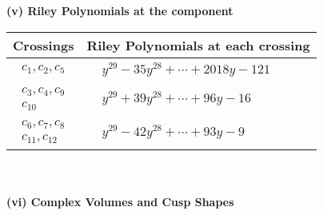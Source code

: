 \documentclass[1p]{elsarticle_modified}
\theoremstyle{definition}
\begin{document}
\newpage\renewcommand{\arraystretch}{1}
\flushleft \textbf{(v) Riley Polynomials at the component}\newline \\
\begin{tabular}{m{50pt}|m{274pt}}
Crossings & \hspace{64pt}Riley Polynomials at each crossing \\
\hline $$\begin{aligned}c_{1},c_{2},c_{5}\end{aligned}$$&$\begin{aligned}
&y^{29}-35 y^{28}+\cdots+2018 y-121
\end{aligned}$\\
\hline $$\begin{aligned}c_{3},c_{4},c_{9}\\c_{10}\end{aligned}$$&$\begin{aligned}
&y^{29}+39 y^{28}+\cdots+96 y-16
\end{aligned}$\\
\hline $$\begin{aligned}c_{6},c_{7},c_{8}\\c_{11},c_{12}\end{aligned}$$&$\begin{aligned}
&y^{29}-42 y^{28}+\cdots+93 y-9
\end{aligned}$\\
\hline
\end{tabular}\\~\\
\newpage\flushleft \textbf{(vi) Complex Volumes and Cusp Shapes}
\end{document}
